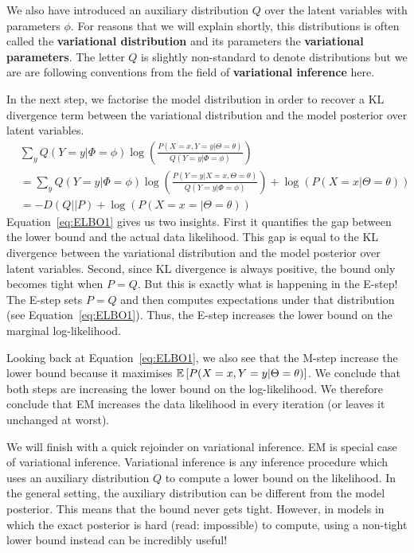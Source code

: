 We also have introduced
an auxiliary distribution $ Q $ over the latent variables with parameters $ \phi $. 
For reasons that we will explain shortly,
this distributions is often called the \textbf{variational distribution} and its parameters the
\textbf{variational parameters}. The letter $ Q $ is slightly non-standard to denote distributions but
we are are following conventions from the field of \textbf{variational inference} here.

In the next step, we factorise the model distribution in order to recover a KL divergence term between
the variational distribution and the model posterior over latent variables.
\begin{align}
&\sum_{y} Q(Y=y|\Phi=\phi) \log\left(\frac{P(X=x, Y=y| \Theta = \theta)}{Q(Y=y|\Phi=\phi)}\right) \\
&= \sum_{y} Q(Y=y|\Phi=\phi) \log\left(\frac{P(Y=y|X=x, \Theta = \theta)}{Q(Y=y|\Phi=\phi)}\right) + \log(P(X=x|\Theta=\theta)) \\
&= -D(Q||P) + \log(P(X=x=|\Theta=\theta)) \label{eq:ELBO2}
\end{align}
Equation~\eqref{eq:ELBO1} gives us two insights. First it quantifies the gap between the lower bound
and the actual data likelihood. This gap is equal to the KL divergence between the variational distribution
and the model posterior over latent variables. Second, since KL divergence is always positive, the bound only becomes
tight when $ P=Q $. But this is exactly what is happening in the E-step! The E-step sets $ P=Q $ and
then computes expectations under that distribution (see Equation~\eqref{eq:ELBO1}). Thus, the E-step increases
the lower bound on the marginal log-likelihood.

Looking back at Equation~\eqref{eq:ELBO1}, we also see that the M-step increase the lower bound because 
it maximises $ \mathbb{E}\left[P(X=x, Y=y| \Theta = \theta)\right] $. We conclude that both steps
are increasing the lower bound on the log-likelihood. We therefore conclude that EM increases the data likelihood
in every iteration (or leaves it unchanged at worst).

We will finish with a quick rejoinder on variational inference. EM is special case of variational inference.
Variational inference is any inference procedure which uses an auxiliary distribution $ Q $ to compute
a lower bound on the likelihood. In the general setting, the auxiliary distribution can be different from the 
model posterior. This means that the bound never gets tight. However, in models in which the exact posterior 
is hard (read: impossible) to compute, using a non-tight lower bound instead can be incredibly useful!

